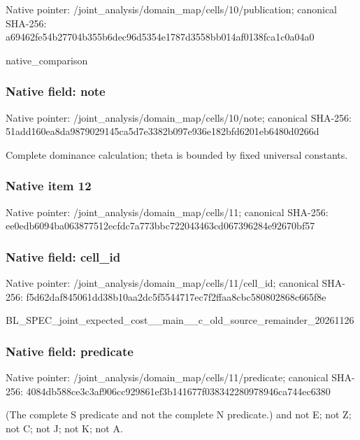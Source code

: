 \documentclass[10pt,a4paper]{article}
\begin{document}
Native pointer: /joint\_analysis/domain\_m\allowbreak{}ap/cells/10/publication; canonical SHA-256: a69462fe54b27704b355b6de\allowbreak{}c96d5354e1787d3558bb014a\allowbreak{}f0138fca1c0a04a0


native\_comparison


\subsubsection{Native field: note}


Native pointer: /joint\_analysis/domain\_m\allowbreak{}ap/cells/10/note; canonical SHA-256: 51add160ea8da9879029145c\allowbreak{}a5d7e3382b097e936e182bfd\allowbreak{}6201eb6480d0266d


Complete dominance calculation; theta is bounded by fixed universal constants.


\subsubsection{Native item 12}


Native pointer: /joint\_analysis/domain\_map/cells/11; canonical SHA-256: ee0edb6094ba063877512ecf\allowbreak{}dc7a773bbc722043463cd067\allowbreak{}396284e92670bf57



\subsubsection{Native field: cell\_id}


Native pointer: /joint\_analysis/domain\_m\allowbreak{}ap/cells/11/cell\_id; canonical SHA-256: f5d62daf845061dd38b10aa2\allowbreak{}dc5f5544717ec7f2ffaa8cbc\allowbreak{}580802868c665f8e


BL\_SPEC\_joint\_expected\_c\allowbreak{}ost\_\_main\_\_c\_old\_source\_\allowbreak{}remainder\_20261126


\subsubsection{Native field: predicate}


Native pointer: /joint\_analysis/domain\_m\allowbreak{}ap/cells/11/predicate; canonical SHA-256: 4084db588ce3c3af906cc929\allowbreak{}861ef3b141677f0383422809\allowbreak{}78946ca744ec6380


(The complete S predicate and not the complete N predicate.) and not E; not Z; not C; not J; not K; not A.
\end{document}
